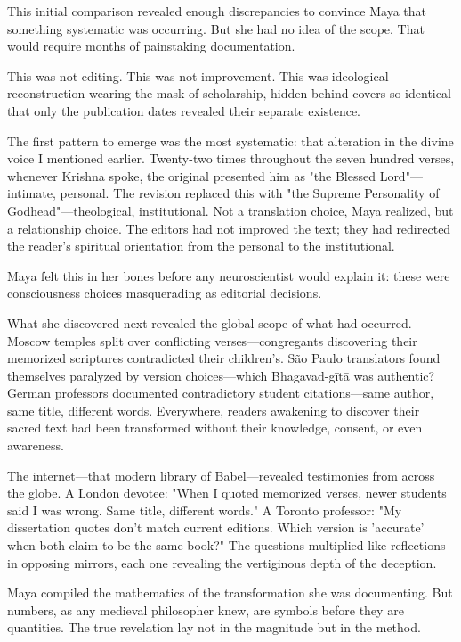 \documentclass[12pt,twoside]{book}
\begin{document}
This initial comparison revealed enough discrepancies to convince Maya that something systematic was occurring. But she had no idea of the scope. That would require months of painstaking documentation.

This was not editing. This was not improvement. This was ideological reconstruction wearing the mask of scholarship, hidden behind covers so identical that only the publication dates revealed their separate existence.

The first pattern to emerge was the most systematic: that alteration in the divine voice I mentioned earlier. Twenty-two times throughout the seven hundred verses, whenever Krishna spoke, the original presented him as "the Blessed Lord"—intimate, personal. The revision replaced this with "the Supreme Personality of Godhead"—theological, institutional. Not a translation choice, Maya realized, but a relationship choice. The editors had not improved the text; they had redirected the reader's spiritual orientation from the personal to the institutional.

Maya felt this in her bones before any neuroscientist would explain it: these were consciousness choices masquerading as editorial decisions.

What she discovered next revealed the global scope of what had occurred. Moscow temples split over conflicting verses—congregants discovering their memorized scriptures contradicted their children's. São Paulo translators found themselves paralyzed by version choices—which Bhagavad-gītā was authentic? German professors documented contradictory student citations—same author, same title, different words. Everywhere, readers awakening to discover their sacred text had been transformed without their knowledge, consent, or even awareness.

The internet—that modern library of Babel—revealed testimonies from across the globe. A London devotee: "When I quoted memorized verses, newer students said I was wrong. Same title, different words." A Toronto professor: "My dissertation quotes don't match current editions. Which version is 'accurate' when both claim to be the same book?" The questions multiplied like reflections in opposing mirrors, each one revealing the vertiginous depth of the deception.

Maya compiled the mathematics of the transformation she was documenting. But numbers, as any medieval philosopher knew, are symbols before they are quantities. The true revelation lay not in the magnitude but in the method.
\end{document}
